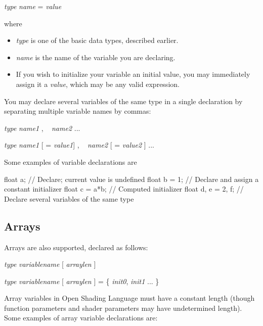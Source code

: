 \documentclass[11pt,letterpaper]{book}
\def\langname{Open Shading Language\xspace}
\begin{document}
\spc \emph{type} \emph{name} = \emph{value}
\vspace{12pt}

\noindent where

\begin{itemize}
\item \emph{type} is one of the basic data types, described earlier.
\item \emph{name} is the name of the variable you are declaring.
\item If you wish to initialize your variable an initial value, you may
immediately assign it a \emph{value}, which may be any valid expression.
\end{itemize}

You may declare several variables of the same type in a single
declaration by separating multiple variable names by commas:

\vspace{12pt}
\spc \emph{type} \emph{name1} {\cf ,} ~ \emph{name2} ...

\spc \emph{type} \emph{name1} [ = \emph{value1}] {\cf ,} ~ \emph{name2} [ =
  \emph{value2} ] ...
\vspace{12pt}


\noindent Some examples of variable declarations are

\begin{code}
    float a;           // Declare; current value is undefined
    float b = 1;       // Declare and assign a constant initializer
    float c = a*b;     // Computed initializer
    float d, e = 2, f; // Declare several variables of the same type
\end{code}

\subsection{Arrays}
 

Arrays are also supported, declared as follows:

\vspace{12pt}
\spc \emph{type} \emph{variablename}
 {\cf [} \emph{arraylen} {\cf ]}

\spc \emph{type} \emph{variablename}
 {\cf [} \emph{arraylen} {\cf ]} = {\cf \{ }
 \emph{init0}{\cf ,} \emph{init1} ... {\cf \}}
\vspace{12pt}

\noindent Array variables in \langname must have a constant length
(though function parameters and shader parameters may have undetermined
length).  Some examples of array variable declarations are:
\end{document}
